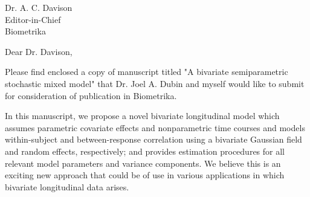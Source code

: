 \documentclass[11pt]{letter} %
\begin{document}

\begin{letter}{Dr. A. C. Davison \\
Editor-in-Chief  \\
Biometrika \\
} 



\signature{Kexin Ji \\
Department of Statistics and Actuarial Science \\
University of Waterloo \\
Waterloo, Ontario, Canada \\
N2L 3G1} %


\opening{Dear Dr. Davison,} 
 
Please find enclosed a copy of manuscript titled "A bivariate semiparametric stochastic mixed model" that Dr. Joel A. Dubin and myself would like to submit for consideration of publication in Biometrika.

In this manuscript, we propose a novel bivariate longitudinal model which assumes parametric covariate effects and nonparametric time courses and models within-subject and between-response correlation using a bivariate Gaussian field and random effects, respectively; and provides estimation procedures for all relevant model parameters and variance components. 
We believe this is an exciting new approach that could be of use in various applications in which bivariate longitudinal data arises.
 

\end{letter}
\end{document}
